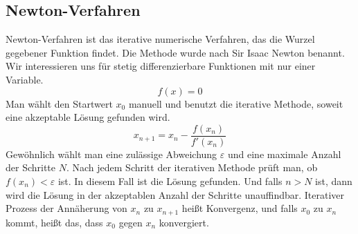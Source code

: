 \documentclass[a4paper,12pt]{llncs}
\numberwithin{equation}{section}
\begin{document}
\subsection{Newton-Verfahren}
Newton-Verfahren ist das iterative numerische Verfahren, das die Wurzel gegebener Funktion findet.
Die Methode wurde nach Sir Isaac Newton benannt. \\
Wir interessieren uns für stetig differenzierbare Funktionen mit nur einer Variable.
\[
f(x) = 0
\] 
Man wählt den Startwert $x_0$ manuell und benutzt die iterative Methode, soweit eine akzeptable Lösung gefunden wird.
\[
x_{n+1} = x_n - \frac{f(x_n)}{f'(x_n)}
\] 
Gewöhnlich wählt man eine zulässige Abweichung $\varepsilon$ und eine maximale Anzahl der Schritte $N$.
Nach jedem Schritt der iterativen Methode prüft man, ob $f(x_n)  < \varepsilon$ ist. 
In diesem Fall ist die Lösung gefunden.
Und falls $n > N$ ist, dann wird die Lösung in der akzeptablen Anzahl der Schritte unauffindbar. 
Iterativer Prozess der Annäherung von $x_n$ zu $x_{n+1}$ heißt Konvergenz, und falls $x_0$ zu $x_n$ kommt, heißt das, dass $x_0$ gegen $x_n$ konvergiert.
\end{document}
